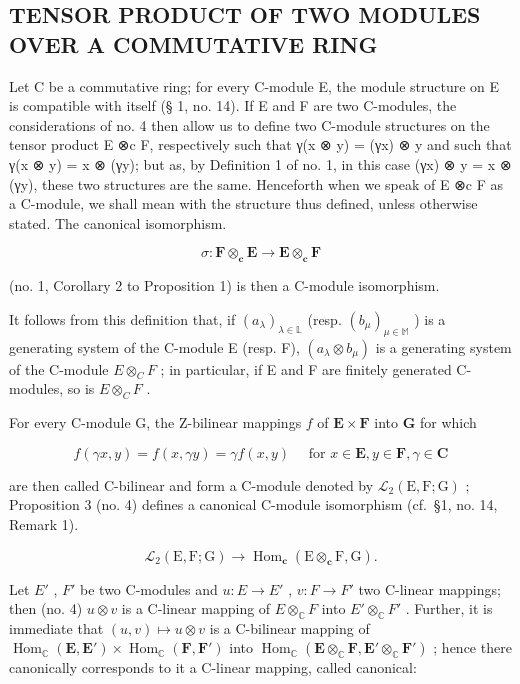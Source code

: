\subsection{TENSOR PRODUCT OF TWO MODULES OVER A COMMUTATIVE RING}

Let C be a commutative ring; for every C-module E, the module structure on E is compatible with itself (§ 1, no. 14). If E and F are two C-modules, the considerations of no. 4 then allow us to define two C-module structures on the tensor product E ⊗c F, respectively such that γ(x ⊗ y) = (γx) ⊗ y and such that γ(x ⊗ y) = x ⊗ (γy); but as, by Definition 1 of no. 1, in this case (γx) ⊗ y = x ⊗ (γy), these two structures are the same. Henceforth when we speak of E ⊗c F as a C-module, we shall mean with the structure thus defined, unless otherwise stated. The canonical isomorphism.

\[
\sigma : \mathbf {F} \otimes_ {\mathbf {c}} \mathbf {E} \rightarrow \mathbf {E} \otimes_ {\mathbf {c}} \mathbf {F}
\]

(no. 1, Corollary 2 to Proposition 1) is then a C-module isomorphism.

It follows from this definition that, if \((a_{\lambda})_{\lambda\in\mathbb{L}}\) (resp. \((b_{\mu})_{\mu\in\mathbb{M}}\) ) is a generating system of the C-module E (resp. F), \((a_{\lambda}\otimes b_{\mu})\) is a generating system of the C-module \(E\otimes_{C}F\) ; in particular, if E and F are finitely generated C-modules, so is \(E\otimes_{C}F\) .

For every C-module G, the Z-bilinear mappings \(f\) of \(\mathbf{E} \times \mathbf{F}\) into \(\mathbf{G}\) for which

\[
f (\gamma x, y) = f (x, \gamma y) = \gamma f (x, y) \quad \text { for } x \in \mathbf {E}, y \in \mathbf {F}, \gamma \in \mathbf {C}\tag{9}
\]

are then called C-bilinear and form a C-module denoted by \(\mathcal{L}_2(\mathrm{E},\mathrm{F};\mathrm{G})\) ; Proposition 3 (no. 4) defines a canonical C-module isomorphism (cf.~§1, no. 14, Remark 1).

\[
\mathcal {L} _ {2} (\mathrm{E}, \mathrm{F}; \mathrm{G}) \rightarrow \operatorname{Hom} _ {\mathbf {c}} (\mathrm{E} \otimes_ {\mathbf {c}} \mathrm{F}, \mathrm{G}).\tag{10}
\]

Let \(E'\) , \(F'\) be two C-modules and \(u: E \to E'\) , \(v: F \to F'\) two C-linear mappings; then (no. 4) \(u \otimes v\) is a C-linear mapping of \(E \otimes_{\mathbb{C}} F\) into \(E' \otimes_{\mathbb{C}} F'\) . Further, it is immediate that \((u, v) \mapsto u \otimes v\) is a C-bilinear mapping of \(\operatorname{Hom}_{\mathbb{C}}(\mathbf{E}, \mathbf{E}') \times \operatorname{Hom}_{\mathbb{C}}(\mathbf{F}, \mathbf{F}')\) into \(\operatorname{Hom}_{\mathbb{C}}(\mathbf{E} \otimes_{\mathbb{C}} \mathbf{F}, \mathbf{E}' \otimes_{\mathbb{C}} \mathbf{F}')\) ; hence there canonically corresponds to it a C-linear mapping, called canonical:

